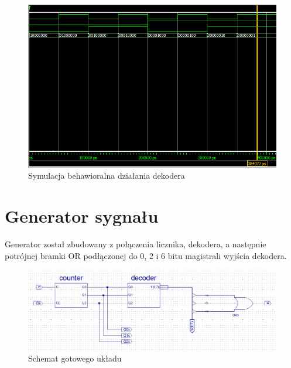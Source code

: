 \documentclass[wide,a4paper,titlepage,12pt] {article}
\begin{document}
  \begin{figure}[htbp]
    \begin{center}
      \includegraphics[scale=0.4]{dekoder_beh.png}
      \caption{Symulacja behawioralna działania dekodera}
    \end{center}
  \end{figure}

  \newpage

  \section{Generator sygnału}
  Generator został zbudowany z połączenia licznika, dekodera, a następnie potrójnej bramki OR podłączonej do 0, 2 i 6 bitu magistrali wyjścia dekodera.

  \begin{figure}[htbp]
    \begin{center}
      \includegraphics[scale=0.4]{uklad.png}
      \caption{Schemat gotowego układu}
    \end{center}
  \end{figure}
\end{document}
